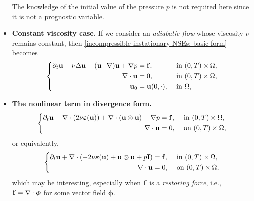 \documentclass[oneside,11pt]{book}
\numberwithin{equation}{section}
\begin{document}
\begin{itemize}
    The knowledge of the initial value of the pressure $p$ is not required here since it is not a prognostic variable.
    \item \textbf{Constant viscosity case.} If we consider an \textit{adiabatic flow} whose viscosity $\nu$ remains constant, then \eqref{incompressible instationary NSEs: basic form} becomes
    \begin{equation}
        \label{incompressible instationary NSEs: constant viscosity}
        \left\{\begin{split}
            \partial_t{\bf u} - \nu\Delta{\bf u} + ({\bf u}\cdot\nabla){\bf u} + \nabla p &= {\bf f},&&\mbox{ in }(0,T)\times\Omega,\\
            \nabla\cdot{\bf u} &= 0,&&\mbox{ in }(0,T)\times\Omega,\\
            {\bf u}_0 &= {\bf u}(0,\cdot),&&\mbox{ in }\Omega,
        \end{split}\right.
    \end{equation}
    \item \textbf{The nonlinear term in divergence form.}
    \begin{equation}
        \left\{\begin{split}
            \partial_t{\bf u} - \nabla\cdot(2\nu\boldsymbol{\varepsilon}({\bf u})) + \nabla\cdot({\bf u}\otimes{\bf u}) + \nabla p &= {\bf f},&&\mbox{ in }(0,T)\times\Omega,\\
            \nabla\cdot{\bf u} &= 0,&&\mbox{ on }(0,T)\times\Omega,
        \end{split}\right.
    \end{equation}
    or equivalently,
    \begin{equation}
        \label{incompressible instationary NSEs: conservative form}
        \left\{\begin{split}
            \partial_t{\bf u} + \nabla\cdot(-2\nu\boldsymbol{\varepsilon}({\bf u}) + {\bf u}\otimes{\bf u} + p{\bf I}) &= {\bf f},&&\mbox{ in }(0,T)\times\Omega,\\
            \nabla\cdot{\bf u} &= 0,&&\mbox{ on }(0,T)\times\Omega,
        \end{split}\right.
    \end{equation}
    which may be interesting, especially when ${\bf f}$ is a \textit{restoring force}, i.e., ${\bf f} = \nabla\cdot\boldsymbol{\phi}$ for some vector field $\boldsymbol{\phi}$.
    

\end{itemize}
\end{document}
